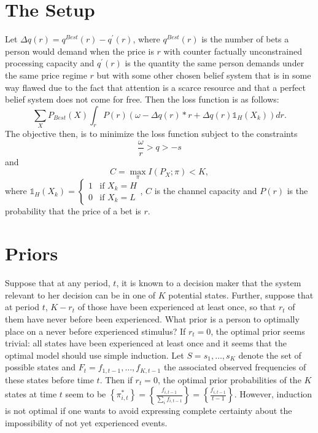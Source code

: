 \documentclass[11pt]{article}
\begin{document}
\section{The Setup}
Let $\Delta q(r) = q^{Best}(r)-q^{'}(r)$, where $q^{Best}(r)$ is the number of bets a person would demand when the price is $r$ with counter factually unconstrained processing capacity and $q^{'}(r)$ is the quantity the same person demands under the same price regime $r$ but with some other chosen belief system that is in some way flawed due to the fact that attention is a scarce resource and that a perfect belief system does not come for free.  Then the loss function is as follows:    
\begin{equation}
\sum_{X}P_{Best}(X)\int_r P(r)(\omega-\Delta q(r)*r + \Delta q(r)\mathds{1}_H(X_k))dr.
\end{equation}
The objective then, is to minimize the loss function subject to the constraints
\begin{equation}
\frac{\omega}{r} > q > -s
\end{equation}
and
\begin{equation}
C = \max_{\pi}I(P_X; \pi)<K,
\end{equation}
where $\mathds{1}_H(X_k) =\begin{cases} 1 &\mbox{if } X_k = H \\
0 & \mbox{if } X_k = L \end{cases}$, $C$ is the channel capacity and $P(r)$ is the probability that the price of a bet is $r$. 
\section{Priors}

Suppose that at any period, $t$, it is known to a decision maker that the system relevant to her decision can be in one of $K$ potential states.  Further, suppose that at period $t$, $K - r_t$ of those have been experienced at least once, so that $r_t$ of them have never before been experienced. What prior is a person to optimally place on a never before experienced stimulus? If $r_t=0$, the optimal prior seems trivial: all states have been experienced at least once and it seems that the optimal model should use simple induction. Let $S=s_1, \ldots, s_K$ denote the set of possible states and $F_t=f_{1, t-1}, \ldots, f_{K, t-1}$ the associated observed frequencies of these states before time $t$. Then if $r_t=0$, the optimal prior probabilities of the $K$ states at time $t$ seem to be $\left\{\pi_{i, t}^{*}\right\}=\left\{\frac{f_{i, t-1}}{\sum_i f_{i, t-1}}\right\}=\left\{\frac{f_{i, t-1}}{t-1}\right\}$. However, induction is not optimal if one wants to avoid expressing complete certainty about the impossibility of not yet experienced events. 
\\
\end{document}
